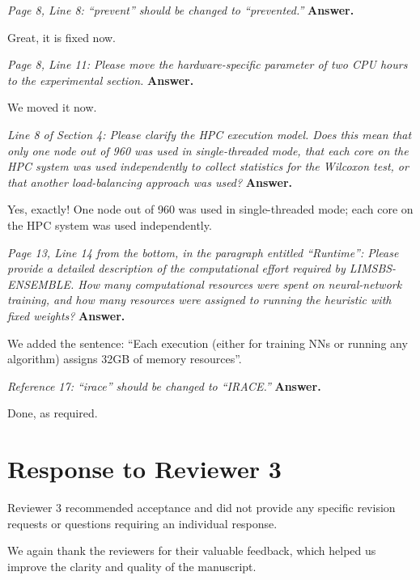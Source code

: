 \documentclass[11pt,a4paper]{article}
\renewenvironment{leftbar}{%
  \def\FrameCommand{\textcolor{reviewbar}{\vrule width 3pt}\hspace{10pt}}%
  \MakeFramed{\advance\hsize-\width\FrameRestore}%
}{\endMakeFramed}
\newcommand{\reviewcomment}[1]{%
\begin{leftbar}
\textit{#1}
\end{leftbar} \textbf{Answer.} 
}
\begin{document}
\reviewcomment{Page 8, Line 8: ``prevent'' should be changed to ``prevented.''}
Great, it is fixed now.

\reviewcomment{Page 8, Line 11: Please move the hardware-specific parameter of two CPU hours to the experimental section.}

We moved it now.


\reviewcomment{Line 8 of Section 4: Please clarify the HPC execution model. Does this mean that only one node out of 960 was used in single-threaded mode, that each core on the HPC system was used independently to collect statistics for the Wilcoxon test, or that another load-balancing approach was used?}

Yes, exactly! One node out of 960 was used in single-threaded mode; each core on the HPC system was used independently.

\reviewcomment{Page 13, Line 14 from the bottom, in the paragraph entitled ``Runtime'': Please provide a detailed description of the computational effort required by LIMSBS-ENSEMBLE. How many computational resources were spent on neural-network training, and how many resources were assigned to running the heuristic with fixed weights?}

We added the sentence: ``Each execution (either for training NNs or running any algorithm) assigns  32GB of memory resources''.

\reviewcomment{Reference 17: ``irace'' should be changed to ``IRACE.''}

Done, as required.

\section*{Response to Reviewer 3}

Reviewer 3 recommended acceptance and did not provide any specific revision requests or questions requiring an individual response.

\vspace{1em}

We again thank the reviewers for their valuable feedback, which helped us improve the clarity and quality of the manuscript.
\end{document}
